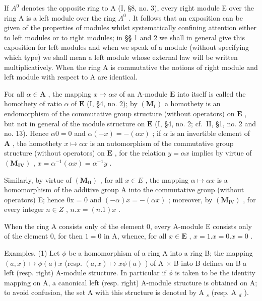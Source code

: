 If \(A^{0}\) denotes the opposite ring to A (I, §8, no. 3), every right module E over the ring A is a left module over the ring \(A^{0}\) . It follows that an exposition can be given of the properties of modules whilst systematically confining attention either to left modules or to right modules; in §§ 1 and 2 we shall in general give this exposition for left modules and when we speak of a module (without specifying which type) we shall mean a left module whose external law will be written multiplicatively. When the ring A is commutative the notions of right module and left module with respect to A are identical.

For all \(\alpha \in \mathbf{A}\) , the mapping \(x \mapsto \alpha x\) of an A-module \(\mathbf{E}\) into itself is called the homothety of ratio \(\alpha\) of \(\mathbf{E}\) (I, §4, no. 2); by \((\mathbf{M}_{\mathbf{I}})\) a homothety is an endomorphism of the commutative group structure (without operators) on \(\mathbf{E}\) , but not in general of the module structure on \(\mathbf{E}\) (I, §4, no. 2; cf.~II, §1, no. 2 and no. 13). Hence \(\alpha 0 = 0\) and \(\alpha(-x) = -(\alpha x)\) ; if \(\alpha\) is an invertible element of \(\mathbf{A}\) , the homothety \(x \mapsto \alpha x\) is an automorphism of the commutative group structure (without operators) on \(\mathbf{E}\) , for the relation \(y = \alpha x\) implies by virtue of \((\mathbf{M}_{\mathbf{IV}})\) , \(x = \alpha^{-1}(\alpha x) = \alpha^{-1}y\) .

Similarly, by virtue of \((\mathbf{M}_{\mathrm{II}})\) , for all \(x \in E\) , the mapping \(\alpha \mapsto \alpha x\) is a homomorphism of the additive group A into the commutative group (without operators) E; hence 0x = 0 and \((- \alpha)x = -(\alpha x)\) ; moreover, by \((\mathbf{M}_{\mathrm{IV}})\) , for every integer \(n \in Z\) , \(n.x = (n.1)x\) .

When the ring A consists only of the element 0, every A-module E consists only of the element 0, for then \(1 = 0\) in A, whence, for all \(x \in \mathbf{E}\) , \(x = 1.x = 0.x = 0\) .

Examples. (1) Let \(\phi\) be a homomorphism of a ring A into a ring B; the mapping \((a, x) \mapsto \phi(a)x\) (resp. \((a, x) \mapsto x\phi(a)\) ) of A × B into B defines on B a left (resp. right) A-module structure. In particular if \(\phi\) is taken to be the identity mapping on A, a canonical left (resp. right) A-module structure is obtained on A; to avoid confusion, the set A with this structure is denoted by A \(_s\) (resp. A \(_d\) ).

